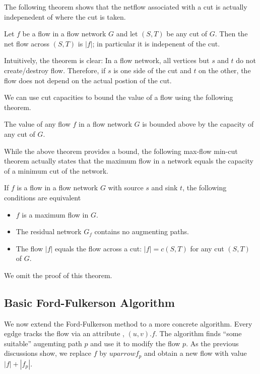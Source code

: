 The following theorem shows that the netflow associated with a cut is actually indepenedent of where the cut is taken.

\begin{theorem}
  Let $f$ be a flow in a flow network $G$ and let $(S,T)$ be any cut of $G$. Then the net flow across $(S,T)$ is $|f|$; in particular it is indepenent of the cut.
\end{theorem}

Intuitively, the theorem is clear: In a flow network, all vertices but $s$ and $t$ do not create/destroy flow. Therefore, if $s$ is one side of the cut and $t$ on the other, the flow does not depend on the actual postion of the cut. 

We can use cut capacities to bound the value of a flow using the following theorem.

\begin{theorem}
  The value of any flow $f$ in a flow network $G$ is bounded above by the capacity of any cut of $G$.
\end{theorem}

While the above theorem provides a bound, the following max-flow min-cut theorem actually states that the maximum flow in a network equals the capacity of a minimum cut of the network.

\begin{theorem}
  If $f$ is a flow in a flow network $G$ with source $s$ and sink $t$, the following conditions are equivalent
  \begin{itemize}
  \item $f$ is a maximum flow in $G$.
  \item The residual network $G_f$ contains no augmenting paths.
  \item The flow $|f|$ equals the flow across a cut: $|f| = c(S,T)$ for any cut $(S,T)$ of $G$.
  \end{itemize}
\end{theorem}

We omit the proof of this theorem.

\subsection{Basic Ford-Fulkerson Algorithm}

We now extend the Ford-Fulkerson method to a more concrete algorithm. Every egdge tracks the flow via an attribute , $(u,v).f$. The algorithm finds ``some suitable'' augemting path $p$ and use it to modify the flow $p$. As the previous discussions show, we replace $f$ by $uparrow f_p$ and obtain a new flow with value $|f| + |f_p|$.  

